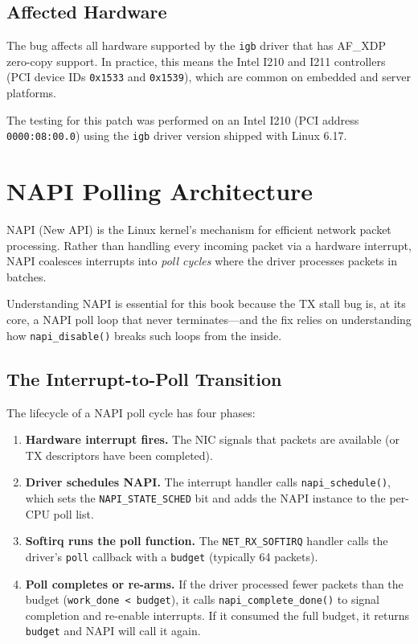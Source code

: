 \documentclass[11pt,a4paper,openany]{book}
\newcommand{\func}[1]{\texttt{#1()}}
\newcommand{\sym}[1]{\texttt{#1}}
\newcommand{\flag}[1]{\texttt{#1}}
\begin{document}
\section{Affected Hardware}

The bug affects all hardware supported by the \texttt{igb} driver that has
AF\_XDP zero-copy support.  In practice, this means the Intel I210 and
I211 controllers (PCI device IDs \texttt{0x1533} and \texttt{0x1539}),
which are common on embedded and server platforms.

The testing for this patch was performed on an Intel I210 (PCI
address \texttt{0000:08:00.0}) using the \texttt{igb} driver version
shipped with Linux 6.17.

\chapter{NAPI Polling Architecture}
\label{ch:napi}

NAPI (New API) is the Linux kernel's mechanism for efficient network
packet processing.  Rather than handling every incoming packet via a
hardware interrupt, NAPI coalesces interrupts into \emph{poll cycles}
where the driver processes packets in batches.

Understanding NAPI is essential for this book because the TX stall bug
is, at its core, a NAPI poll loop that never terminates---and the fix
relies on understanding how \func{napi\_disable} breaks such loops from
the inside.

\section{The Interrupt-to-Poll Transition}

The lifecycle of a NAPI poll cycle has four phases:

\begin{enumerate}
\item \textbf{Hardware interrupt fires.}  The NIC signals that packets
    are available (or TX descriptors have been completed).
\item \textbf{Driver schedules NAPI.}  The interrupt handler calls
    \func{napi\_schedule}, which sets the \flag{NAPI\_STATE\_SCHED} bit
    and adds the NAPI instance to the per-CPU poll list.
\item \textbf{Softirq runs the poll function.}  The \texttt{NET\_RX\_SOFTIRQ}
    handler calls the driver's \sym{poll} callback with a
    \texttt{budget} (typically 64 packets).
\item \textbf{Poll completes or re-arms.}  If the driver processed fewer
    packets than the budget (\texttt{work\_done < budget}), it calls
    \func{napi\_complete\_done} to signal completion and re-enable
    interrupts.  If it consumed the full budget, it returns
    \texttt{budget} and NAPI will call it again.
\end{enumerate}
\end{document}
